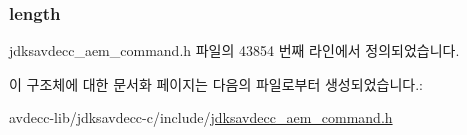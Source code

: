 \subsubsection[{\texorpdfstring{length}{length}}]{ length}\hypertarget{structjdksavdecc__aem__command__get__memory__object__length__response_a190b76b1f3d5bd26920300e5f073739b}{}\label{structjdksavdecc__aem__command__get__memory__object__length__response_a190b76b1f3d5bd26920300e5f073739b}


jdksavdecc\+\_\+aem\+\_\+command.\+h 파일의 43854 번째 라인에서 정의되었습니다.



이 구조체에 대한 문서화 페이지는 다음의 파일로부터 생성되었습니다.\+:\begin{DoxyCompactItemize}
\item 
avdecc-\/lib/jdksavdecc-\/c/include/\hyperlink{jdksavdecc__aem__command_8h}{jdksavdecc\+\_\+aem\+\_\+command.\+h}\end{DoxyCompactItemize}
